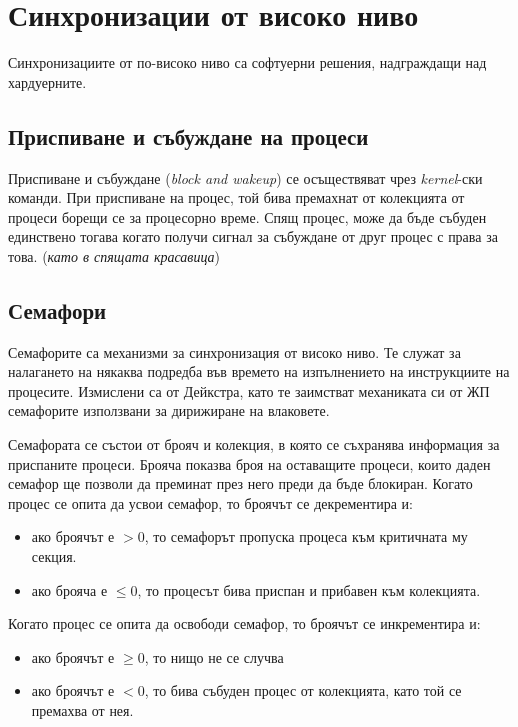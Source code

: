 \documentclass[fleqn,12pt]{article}
\begin{document}
\section{Синхронизации от високо ниво}

Синхронизациите от по-високо ниво са софтуерни решения, надграждащи над хардуерните.

\subsection{Приспиване и събуждане на процеси}

Приспиване и събуждане (\textit{block and wakeup}) се осъществяват чрез \textit{kernel}-ски команди.
При приспиване на процес, той бива премахнат от колекцията от процеси борещи се за процесорно време.
Спящ процес, може да бъде събуден единствено тогава когато получи сигнал за събуждане от друг процес с права за това. (\textit{като в спящата красавица})

\subsection{Семафори}

Семафорите са механизми за синхронизация от високо ниво.
Те служат за налагането на някаква подредба във времето на изпълнението на инструкциите на процесите.
Измислени са от Дейкстра, като те заимстват механиката си от ЖП семафорите използвани за дирижиране на влаковете.

Семафората се състои от брояч и колекция, в която се съхранява информация за приспаните процеси.
Брояча показва броя на оставащите процеси, които даден семафор ще позволи да преминат през него преди да бъде блокиран.
Когато процес се опита да усвои семафор, то броячът се декрементира и:
\begin{itemize}
    \item ако броячът е $> 0$, то семафорът пропуска процеса към критичната му секция.
    \item ако брояча е $\leq 0$, то процесът бива приспан и прибавен към колекцията.
\end{itemize}
Когато процес се опита да освободи семафор, то броячът се инкрементира и:
\begin{itemize}
    \item ако броячът е $\geq 0$, то нищо не се случва
    \item ако броячът е $< 0$, то бива събуден процес от колекцията, като той се премахва от нея.
\end{itemize}
\end{document}
